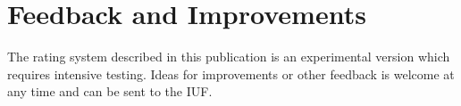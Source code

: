 \documentclass[a4paper,oneside]{scrartcl}
\begin{document}
\section{Feedback and Improvements}
The rating system described in this publication is an experimental version which
requires intensive testing. Ideas for improvements or other feedback is welcome
at any time and can be sent to the IUF.
\end{document}
